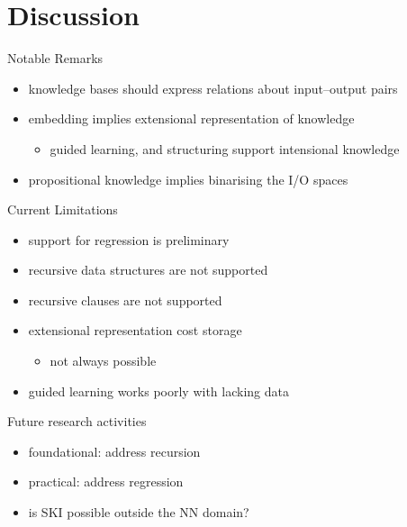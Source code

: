 \documentclass[presentation]{beamer}\mode<presentation>{\usetheme{AMSBolognaFC}}
\begin{document}
\section{Discussion}

\begin{frame}{Notable Remarks}
    \begin{itemize}
        \item knowledge bases should express relations about input--output pairs
        \item embedding implies extensional representation of knowledge
        \begin{itemize}
            \item guided learning, and structuring support intensional knowledge
        \end{itemize}
        \item propositional knowledge implies binarising the I/O spaces
    \end{itemize}
\end{frame}

\begin{frame}{Current Limitations}
    \begin{itemize}
        \item support for regression is preliminary
        \item recursive data structures are not supported
        \item recursive clauses are not supported
        \item extensional representation cost storage
        \begin{itemize}
            \item not always possible
        \end{itemize}
        \item guided learning works poorly with lacking data
    \end{itemize}
\end{frame}

\begin{frame}{Future research activities}
    \begin{itemize}
        \item foundational: address recursion
        \item practical: address regression
        \item is SKI possible outside the NN domain?
    \end{itemize}
\end{frame}
\end{document}
